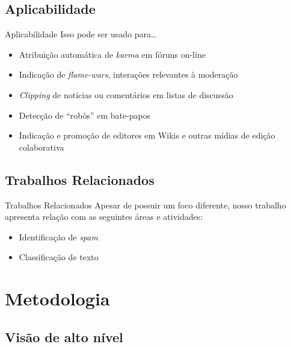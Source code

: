 \documentclass[compress]{beamer}
\begin{document}
\subsection{Aplicabilidade}

    \begin{frame}{Aplicabilidade}
	Isso pode ser usado para\ldots
        \begin{itemize}[<|+->]
            \item \alert{Atribuição automática de \emph{karma} em
            fóruns on-line}

            \item Indicação de \emph{flame-wars}, interações relevantes
            à moderação

	    \item \emph{Clipping} de notícias ou comentários em listas de discussão

            \item Detecção de ``robôs'' em bate-papos

            \item Indicação e promoção de editores em Wikis e outras
            mídias de edição colaborativa
	\end{itemize}
    \end{frame}

\subsection{Trabalhos Relacionados}

    \begin{frame}{Trabalhos Relacionados}
        Apesar de possuir um \alert{foco diferente}, nosso trabalho apresenta
	relação com as seguintes áreas e atividades:
	\begin{itemize}
	    \item Identificação de \emph{spam}
	    \item Classificação de texto
	\end{itemize}
    \end{frame}

\section{Metodologia}
\subsection{Visão de alto nível}
\end{document}
